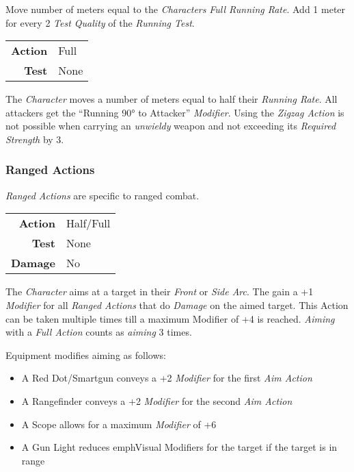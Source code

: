 \hfill

Move number of meters equal to the \emph{Characters} \emph{Full Running Rate}.
Add 1 meter for every 2 \emph{Test Quality } of the \emph{Running Test}.



\begin{tabular}{rl}
    \textbf{Action} & Full \\
    \textbf{Test}   & None \\
\end{tabular}
The \emph{Character} moves a number of meters equal to half their
\emph{Running Rate}. All attackers get the “Running 90° to Attacker”
\emph{Modifier}. Using the \emph{Zigzag Action} is not possible when
carrying an \emph{unwieldy} weapon and not exceeding its
\emph{Required Strength} by 3.

\subsubsection{Ranged Actions}

\emph{Ranged Actions} are specific to ranged combat.

\begin{tabular}{rl}
    \textbf{Action} & Half/Full \\
    \textbf{Test}   & None      \\
    \textbf{Damage} & No        \\
\end{tabular}

\hfill

The \emph{Character} aims at a target in their \emph{Front} or \emph{Side Arc}.
The gain a +1 \emph{Modifier} for all \emph{Ranged Actions} that do
\emph{Damage} on the aimed target. This Action can be taken multiple times till a
maximum Modifier of +4 is reached.
\emph{Aiming} with a \emph{Full Action} counts as \emph{aiming} 3 times.

Equipment modifies aiming as follows:

\begin{itemize}[parsep=0em]
    \item A Red Dot/Smartgun conveys a +2 \emph{Modifier} for the
          first \emph{Aim Action}
    \item A Rangefinder conveys a +2 \emph{Modifier} for the second
          \emph{Aim Action}
    \item A Scope allows for a maximum \emph{Modifier} of +6
    \item A Gun Light reduces emph{Visual Modifiers} for the target if the
          target is in range
\end{itemize}

